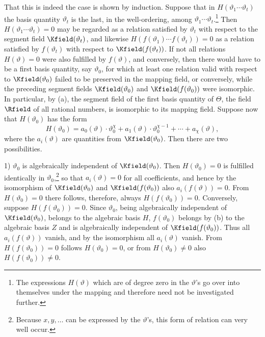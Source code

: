\documentclass[11pt]{article}
\begin{document}
That this is indeed the case is shown by induction. Suppose that in \(H(\vartheta_1\cdots\vartheta_t)\) the basis quantity \(\vartheta_t\) is the last, in the well-ordering, among \(\vartheta_1\cdots\vartheta_t\).\footnote{The expressions \(H(\vartheta)\) which are of degree zero in the \(\vartheta\)'s go over into themselves under the mapping and therefore need not be investigated further.} Then \(H(\vartheta_1\cdots\vartheta_t)=0\) may be regarded as a relation satisfied by \(\vartheta_t\) with respect to the segment field \(\Kfield(\vartheta_t)\), and likewise \(H(f(\vartheta_1)\cdots f(\vartheta_t))=0\) as a relation satisfied by \(f(\vartheta_t)\) with respect to \(\Kfield(f(\vartheta_t))\). If not all relations \(H(\vartheta)=0\) were also fulfilled by \(f(\vartheta)\), and conversely, then there would have to be a first basis quantity, say \(\vartheta_0\), for which at least one relation valid with respect to \(\Kfield(\vartheta_0)\) failed to be preserved in the mapping field, or conversely, while the preceding segment fields \(\Kfield(\vartheta_0)\) and \(\Kfield(f(\vartheta_0))\) were isomorphic. In particular, by (a), the segment field of the first basis quantity of \(\Theta\), the field \(\Rfield\) of all rational numbers, is isomorphic to its mapping field. Suppose now that \(H(\vartheta_0)\) has the form
\[
H(\vartheta_0)=a_0(\vartheta)\cdot\vartheta_0^\chi
+a_1(\vartheta)\cdot\vartheta_0^{\chi-1}+\cdots+a_\chi(\vartheta),
\]
where the \(a_i(\vartheta)\) are quantities from \(\Kfield(\vartheta_0)\). Then there are two possibilities.

1) \(\vartheta_0\) is algebraically independent of \(\Kfield(\vartheta_0)\). Then \(H(\vartheta_0)=0\) is fulfilled identically in \(\vartheta_0\),\footnote{Because \(x,y,\ldots\) can be expressed by the \(\vartheta\)'s, this form of relation can very well occur.} so that \(a_i(\vartheta)=0\) for all coefficients, and hence by the isomorphism of \(\Kfield(\vartheta_0)\) and \(\Kfield(f(\vartheta_0))\) also \(a_i(f(\vartheta))=0\). From \(H(\vartheta_0)=0\) there follows, therefore, always \(H(f(\vartheta_0))=0\). Conversely, suppose \(H(f(\vartheta_0))=0\). Since \(\vartheta_0\), being algebraically independent of \(\Kfield(\vartheta_0)\), belongs to the algebraic basis \(H\), \(f(\vartheta_0)\) belongs by (b) to the algebraic basis \(Z\) and is algebraically independent of \(\Kfield(f(\vartheta_0))\). Thus all \(a_i(f(\vartheta))\) vanish, and by the isomorphism all \(a_i(\vartheta)\) vanish. From \(H(f(\vartheta_0))=0\) follows \(H(\vartheta_0)=0\), or from \(H(\vartheta_0)\ne0\) also \(H(f(\vartheta_0))\ne0\).
\end{document}
